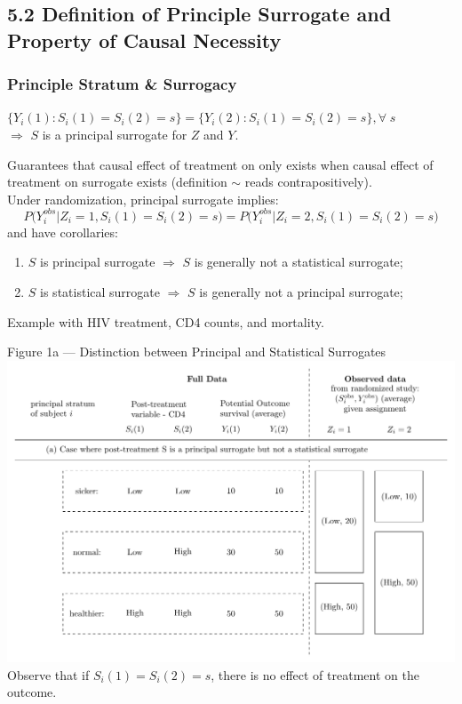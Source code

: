 \documentclass[10pt]{beamer}
\newcommand{\zuokh}{\Big (}
\newcommand{\youkh}{\Big )}
\begin{document}
\subsection{5.2 Definition of Principle Surrogate and Property of Causal Necessity}

\begin{frame}
\small 
\frametitle{Principle Stratum \& Surrogacy}
\begin{definition}
\vspace{3mm}
$\displaystyle \{Y_i(1):S_i(1)=S_i(2)=s\}=\{Y_i(2):S_i(1)=S_i(2)=s\}, \forall \;s $\\
\vspace{3mm}
\hfill $\Longrightarrow$ $S$ is a principal surrogate for $Z$ and $Y$.
	
\end{definition}
Guarantees that causal effect of treatment on only exists when causal effect of treatment on surrogate exists (definition $\sim$ reads contrapositively).\\
\vspace{0.5\baselineskip}
Under randomization, principal surrogate implies:
$$
P\zuokh Y_i^{obs}\Big | Z_i=1,S_i(1)=S_i(2)=s\youkh = P\zuokh Y_i^{obs}\Big | Z_i=2, S_i(1)=S_i(2)=s\youkh
$$
and have corollaries: 
\begin{enumerate}
	\item $S$ is principal surrogate $\Longrightarrow$ $S$ is generally not a statistical surrogate;
	\item $S$ is statistical surrogate $\Longrightarrow$ $S$ is generally not a principal surrogate;
\end{enumerate}

Example with HIV treatment, CD4 counts, and mortality.
\end{frame}
\begin{frame}{\normalsize Figure 1a — Distinction between Principal and Statistical Surrogates}
\includegraphics[width=\linewidth]{figures/figure1/frangakis_rubin_figure.pdf}
{\footnotesize
Observe that if $S_i(1) = S_i(2) = s$, there is no effect of treatment
on the outcome. 
}
\end{frame}
\end{document}
